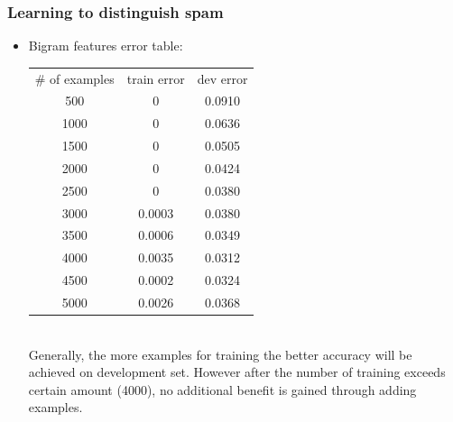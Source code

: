 \documentclass[11pt]{article}
\begin{document}
\begin{onehalfspace}
		\subsubsection*{Learning to distinguish spam}
		\begin{itemize}
			\item
			Bigram features error table:\\
			\begin{tabular}{c | c | c}
			\# of examples & train error & dev error\\
			500 & 0 & 0.0910\\
			1000 & 0 & 0.0636\\
			1500 & 0 & 0.0505\\
			2000 & 0 & 0.0424\\
			2500 & 0 & 0.0380\\
			3000 & 0.0003 & 0.0380\\
			3500 & 0.0006 & 0.0349\\
			4000 & 0.0035 & 0.0312\\
			4500 & 0.0002 & 0.0324\\
			5000 & 0.0026 & 0.0368\\
			\end{tabular}\\
			Generally, the more examples for training the better accuracy will be achieved on development set. However after the number of training exceeds certain amount (4000), no additional benefit is gained through adding examples.
		\end{itemize}

\end{onehalfspace}
\end{document}
